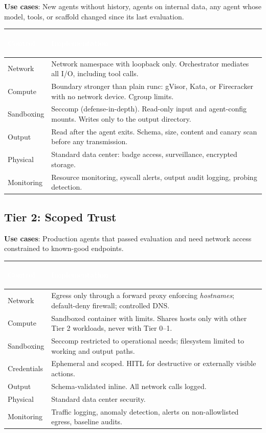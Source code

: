 \documentclass[11pt,letterpaper]{article}
\newcommand{\hrow}{\rowcolor{slategraphite}}
\newcommand{\hdr}[1]{\textcolor{white}{\bfseries\strut #1}}
\begin{document}
\textbf{Use cases}: New agents without history, agents on internal data, any agent whose model, tools, or scaffold changed since its last evaluation.

\begin{longtable}{L{3cm} L{13cm}}
\hrow \hdr{Control} & \hdr{Implementation} \\
\endhead
Network & Network namespace with loopback only. Orchestrator mediates all I/O, including tool calls. \\
Compute & Boundary stronger than plain runc: gVisor, Kata, or Firecracker with no network device. Cgroup limits. \\
Sandboxing & Seccomp (defense-in-depth). Read-only input and agent-config mounts. Writes only to the output directory. \\
Output & Read after the agent exits. Schema, size, content and canary scan before any transmission. \\
Physical & Standard data center: badge access, surveillance, encrypted storage. \\
Monitoring & Resource monitoring, syscall alerts, output audit logging, probing detection. \\*
\bottomrule
\end{longtable}

\subsection{Tier 2: Scoped Trust}
\label{sec:tier2}

\textbf{Use cases}: Production agents that passed evaluation and need network access constrained to known-good endpoints.

\begin{longtable}{L{3cm} L{13cm}}
\hrow \hdr{Control} & \hdr{Implementation} \\
\endhead
Network & Egress only through a forward proxy enforcing \emph{hostnames}; default-deny firewall; controlled DNS. \\
Compute & Sandboxed container with limits. Shares hosts only with other Tier 2 workloads, never with Tier 0--1. \\
Sandboxing & Seccomp restricted to operational needs; filesystem limited to working and output paths. \\
Credentials & Ephemeral and scoped. HITL for destructive or externally visible actions. \\
Output & Schema-validated inline. All network calls logged. \\
Physical & Standard data center security. \\
Monitoring & Traffic logging, anomaly detection, alerts on non-allowlisted egress, baseline audits. \\*
\bottomrule
\end{longtable}
\end{document}
